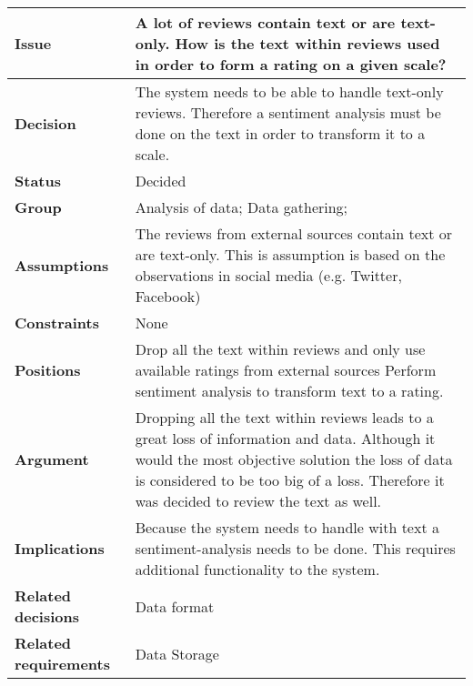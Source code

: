 
\label{dd:t-to-r}
\begin{tabular}{ l  p{10cm}}
\hline
\bf Issue & A lot of reviews contain text or are text-only. How is the text within reviews used in order to form a rating on a given scale? \\
\hline
\bf Decision & The system needs to be able to handle text-only reviews. Therefore a sentiment analysis must be done on the text in order to transform it to a scale. \\
\hline
\bf Status & Decided \\
\hline
\bf Group & Analysis of data; Data gathering; \\
\hline
\bf Assumptions & The reviews from external sources contain text or are text-only. This is assumption is based on the observations in social media (e.g. Twitter, Facebook) \\
\hline
\bf Constraints & None \\
\hline
\bf Positions & Drop all the text within reviews and only use available ratings from external sources \newline\newline
Perform sentiment analysis to transform text to a rating. \\
\hline
\bf Argument & Dropping all the text within reviews leads to a great loss of information and data. Although it would the most objective solution the loss of data is considered to be too big of a loss. Therefore it was decided to review the text as well. \\
\hline
\bf Implications & Because the system needs to handle with text a sentiment-analysis needs to be done. This requires additional functionality to the system. \\
\hline
\bf Related decisions & Data format \\
\hline
\bf Related requirements  & Data Storage \\
\hline
\end{tabular}
